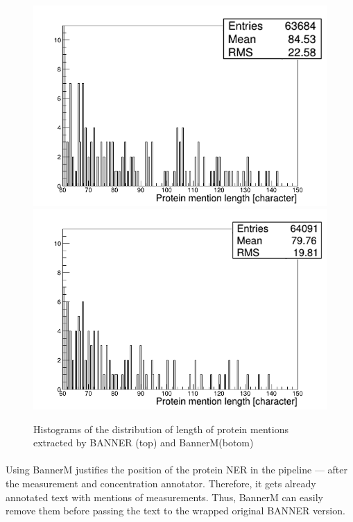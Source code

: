 \documentclass{report}
\begin{document}
                                        \begin{figure}[h!]
                                          \includegraphics[width=.5\textwidth]{fig/banner_prot_length.png}
                                          \includegraphics[width=.5\textwidth]{fig/bannerM_prot_length.png}
                                          \caption{Histograms of the distribution of length of protein mentions extracted by BANNER (top) 
                                            and BannerM(botom)}
                                          \label{fig:bannerVSbannerM}
                                        \end{figure}
                
                \paragraph{}Using BannerM justifies the position of the protein NER 
                in the pipeline --- after the measurement and concentration 
                annotator. Therefore, it gets already annotated text with 
                mentions of measurements. Thus, BannerM
                can easily remove them before passing the text to the wrapped 
                original BANNER \cite{banner} version.       
                
               
\end{document}
